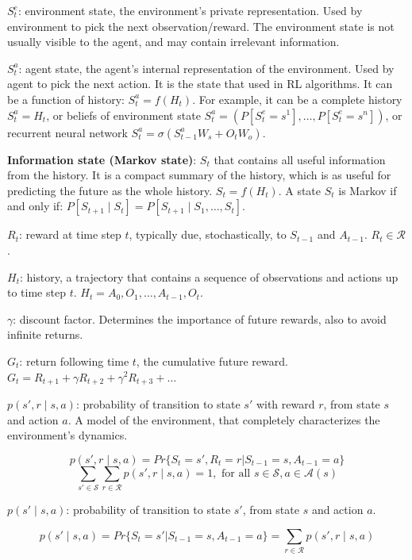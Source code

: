 \documentclass{article}
\begin{document}
\(S_t^e\): environment state, the environment's private representation. 
Used by environment to pick the next observation/reward. 
The environment state is not usually visible to the agent, and may contain irrelevant information.

\(S_t^a\): agent state, the agent's internal representation of the environment. 
Used by agent to pick the next action. 
It is the state that used in RL algorithms. It can be a function of history: \(S_t^a = f(H_t)\). 
For example, it can be a complete history \(S_t^a = H_t\), 
or beliefs of environment state \(S_t^a = (P[S_t^e = s^1], \dots, P[S_t^e = s^n])\), 
or recurrent neural network \(S_t^a = \sigma(S_{t - 1}^a W_s + O_t W_o)\).

\textbf{Information state (Markov state)}: \(S_t\) that contains all useful information from the history. 
It is a compact summary of the history, which is as useful for predicting the future as the whole history. \(S_t = f(H_t)\). 
A state \(S_t\) is Markov if and only if: \(P[S_{t + 1} \mid S_t] = P[S_{t + 1} \mid S_1, \dots, S_t]\).

\(R_t\): reward at time step \(t\), typically due, stochastically, to \(S_{t - 1}\) and \(A_{t - 1}\). \(R_t \in \mathcal{R}\).

\(H_t\): history, a trajectory that contains a sequence of observations and actions up to time step \(t\). \(H_t = A_0, O_1, \dots, A_{t - 1}, O_{t}\).

\(\gamma\): discount factor. Determines the importance of future rewards, also to avoid infinite returns.

\(G_t\): return following time \(t\), the cumulative future reward. \(G_t = R_{t + 1} + \gamma R_{t + 2} + \gamma^2 R_{t + 3} + \dots\)

\(p(s', r \mid s, a)\): probability of transition to state \(s'\) with reward \(r\), from state \(s\) and action \(a\). A model of the environment, that completely characterizes the environment's dynamics.

\[p(s', r \mid s, a) = Pr\{S_t = s', R_t = r | S_{t - 1} = s , A_{t - 1} = a \}\]
\[\sum_{s' \in \mathcal{S}} \sum_{r \in \mathcal{R}} p(s', r \mid s, a) = 1, \text{ for all \(s \in \mathcal{S}, a \in \mathcal{A}(s)\)}\]

\(p(s' \mid s, a)\): probability of transition to state \(s'\), from state \(s\) and action \(a\).

\[p(s' \mid s, a) = Pr\{S_t = s' | S_{t - 1} = s , A_{t - 1} = a \} = \sum_{r \in \mathcal{R}} p(s', r \mid s, a)\]
\end{document}
